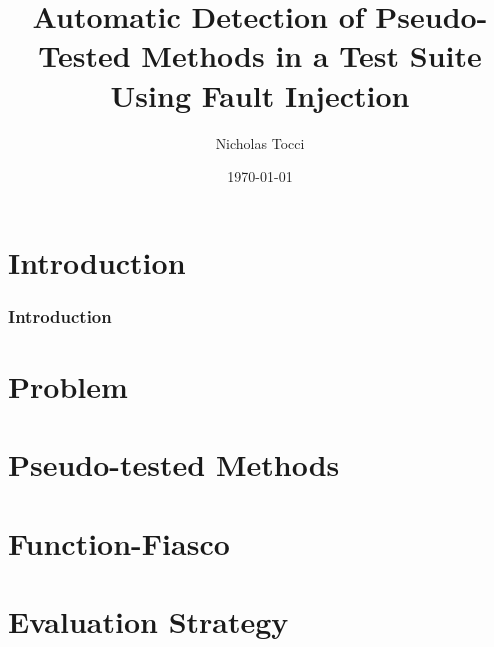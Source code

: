 \documentclass{beamer}
\title{Automatic Detection of Pseudo-Tested Methods in a Test Suite Using Fault Injection}
\author{Nicholas Tocci}
\date{\today}
\begin{document}
\section{Introduction}
\begin{frame}
	\frametitle{Introduction}
	\titlepage
\end{frame}
\section{Problem}
\label{sec:problem}


\section{Pseudo-tested Methods}
\label{sec:pseudo-tested methods}


\section{Function-Fiasco}
\label{sec:function-fiasco}


\section{Evaluation Strategy}
\label{sec:Evaluation Strategy}

\end{document}
